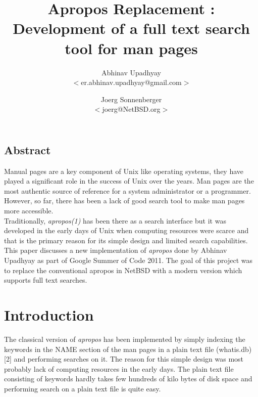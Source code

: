 \documentclass[letterpaper,twocolumn,10pt]{article}
\begin{document}
\date{}

\title{\Large \bf Apropos Replacement : Development of a full text search tool for man pages}

\author{
{\rm Abhinav Upadhyay}\\
$<$er.abhinav.upadhyay@gmail.com$>$
\and
{\rm Joerg Sonnenberger}\\
$<$joerg@NetBSD.org$>$
} %

\maketitle

\thispagestyle{empty}

\subsection*{Abstract}
Manual pages are a key component of Unix like operating systems, they have
played a significant role in the success of Unix over the years. Man pages are
the most authentic source of reference for a system administrator or a
programmer. However, so far, there has been a lack of good search tool to make
man pages more accessible. \\

Traditionally, \textit{apropos(1)} has been there as a search interface but it
was developed in the early days of Unix when computing resources were scarce
and that is the primary reason for its simple design and limited search
capabilities. \\

This paper discusses a new implementation of \textit{apropos} done by
Abhinav Upadhyay as part of
Google Summer of Code 2011. The goal of this project was to replace the
conventional apropos in NetBSD with a modern version which supports full text
searches. \\


\section{Introduction}
The classical version of \textit{apropos} has been implemented by simply
indexing the keywords in the NAME section of the man pages in a plain text file
(whatis.db) [2]
and performing searches on it. The reason for this simple design was most
probably lack of computing resources in the early days. The plain text file
consisting of keywords hardly takes few hundreds of kilo bytes of disk space
and performing search on a plain text file is quite easy. \\
\end{document}
